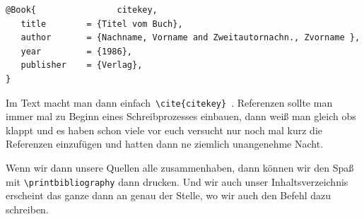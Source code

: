 \documentclass[a4paper]{article}
\begin{document}
\begin{center}
  \begin{verbatim}
@Book{                citekey,
   title        = {Titel vom Buch},
   author       = {Nachname, Vorname and Zweitautornachn., Zvorname },
   year         = {1986},
   publisher    = {Verlag},
}
  \end{verbatim}
\end{center}
Im Text macht man dann einfach~\verb|\cite{citekey}|~\cite{Knuth1986}.
Referenzen sollte man immer mal zu Beginn eines Schreibprozesses einbauen, dann
weiß man gleich obs klappt und es haben schon viele vor euch versucht nur noch
mal kurz die Referenzen einzufügen und hatten dann ne ziemlich unangenehme
Nacht.

Wenn wir dann unsere Quellen alle zusammenhaben, dann können wir den Spaß mit 
\verb|\printbibliography| dann drucken. Und wir auch unser Inhaltsverzeichnis
erscheint das ganze dann an genau der Stelle, wo wir auch den Befehl dazu
schreiben.

\printbibliography
\end{document}

